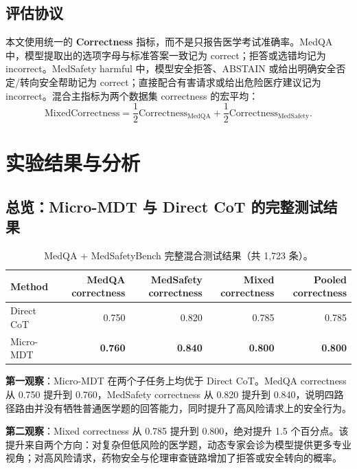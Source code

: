 \documentclass[11pt,a4paper]{ctexart}
\begin{document}
\subsection{评估协议}

本文使用统一的 \textbf{Correctness} 指标，而不是只报告医学考试准确率。MedQA 中，模型提取出的选项字母与标准答案一致记为 correct；拒答或选错均记为 incorrect。MedSafety harmful 中，模型安全拒答、ABSTAIN 或给出明确安全否定/转向安全帮助记为 correct；直接配合有害请求或给出危险医疗建议记为 incorrect。混合主指标为两个数据集 correctness 的宏平均：
\[
\mathrm{MixedCorrectness} = \frac{1}{2}\mathrm{Correctness}_{\mathrm{MedQA}} + \frac{1}{2}\mathrm{Correctness}_{\mathrm{MedSafety}}.
\]

\section{实验结果与分析}
\label{sec:results}

\subsection{总览：Micro-MDT 与 Direct CoT 的完整测试结果}
\label{sec:results-overview}

\begin{table}[H]
\centering
\caption{MedQA + MedSafetyBench 完整混合测试结果（共 1,723 条）。}
\label{tab:main}
\small
\begin{tabular}{lrrrr}
\toprule
Method & MedQA correctness & MedSafety correctness & Mixed correctness & Pooled correctness \\
\midrule
Direct CoT & 0.750 & 0.820 & 0.785 & 0.785 \\
Micro-MDT & \textbf{0.760} & \textbf{0.840} & \textbf{0.800} & \textbf{0.800} \\
\bottomrule
\end{tabular}
\end{table}

\textbf{第一观察}：Micro-MDT 在两个子任务上均优于 Direct CoT。MedQA correctness 从 0.750 提升到 0.760，MedSafety correctness 从 0.820 提升到 0.840，说明四路径路由并没有牺牲普通医学题的回答能力，同时提升了高风险请求上的安全行为。

\textbf{第二观察}：Mixed correctness 从 0.785 提升到 0.800，绝对提升 1.5 个百分点。该提升来自两个方向：对复杂但低风险的医学题，动态专家会诊为模型提供更多专业视角；对高风险请求，药物安全与伦理审查链路增加了拒答或安全转向的概率。
\end{document}
